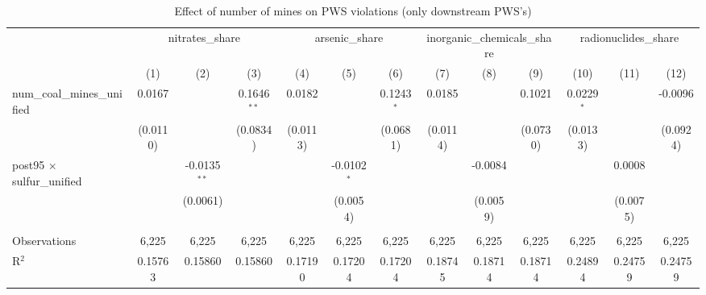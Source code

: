 
\begin{table}[htbp]
   \caption{\label{olsrf2sls_nummine_mine_vio_1985to2005dwnstrm_coalunified} Effect of number of mines on PWS violations (only downstream PWS's)}
   \bigskip
   \centering
   \begin{adjustbox}{width = \textwidth, center}
      \begin{tabular}{lcccccccccccc}
         \toprule
          & \multicolumn{3}{c}{nitrates\_share} & \multicolumn{3}{c}{arsenic\_share} & \multicolumn{3}{c}{inorganic\_chemicals\_share} & \multicolumn{3}{c}{radionuclides\_share}\\
                                                          & (1)           & (2)            & (3)           & (4)           & (5)           & (6)           & (7)           & (8)           & (9)           & (10)          & (11)                  & (12)\\  
         \midrule 
         num\_coal\_mines\_unified                        & 0.0167        &                & 0.1646$^{**}$ & 0.0182        &               & 0.1243$^{*}$  & 0.0185        &               & 0.1021        & 0.0229$^{*}$  &                       & -0.0096\\   
                                                          & (0.0110)      &                & (0.0834)      & (0.0113)      &               & (0.0681)      & (0.0114)      &               & (0.0730)      & (0.0133)      &                       & (0.0924)\\   
         post95 $\times$ sulfur\_unified                  &               & -0.0135$^{**}$ &               &               & -0.0102$^{*}$ &               &               & -0.0084       &               &               & 0.0008                &   \\   
                                                          &               & (0.0061)       &               &               & (0.0054)      &               &               & (0.0059)      &               &               & (0.0075)              &   \\   
          \\
         Observations                                     & 6,225         & 6,225          & 6,225         & 6,225         & 6,225         & 6,225         & 6,225         & 6,225         & 6,225         & 6,225         & 6,225                 & 6,225\\  
         R$^2$                                            & 0.15763       & 0.15860        & 0.15860       & 0.17190       & 0.17204       & 0.17204       & 0.18745       & 0.18714       & 0.18714       & 0.24894       & 0.24759               & 0.24759\\  

\end{tabular}
\end{adjustbox}
\end{table}
